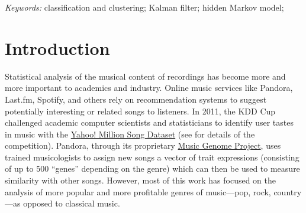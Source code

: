 \documentclass[12pt]{article}
\def\spacingset#1{\renewcommand{\baselinestretch}%
{#1}\small\normalsize} \spacingset{1}
\newcommand{\attn}[1]{\textcolor{red}{Note: #1}}
\begin{document}
\noindent%
{\it Keywords:} classification and clustering; Kalman filter; hidden Markov model; 
\vfill

\newpage

\spacingset{1.45} %











\section{Introduction}
\label{sec:introduction}


Statistical analysis of the musical content of recordings has
become more and more important to academics and industry. Online
music services like Pandora, Last.fm, Spotify, and others rely on
recommendation systems to suggest potentially interesting or related
songs to listeners. In 2011, the KDD Cup challenged academic computer
scientists and statisticians to identify user tastes in music with the
\href{http://labrosa.ee.columbia.edu/millionsong/}{Yahoo! Million
  Song Dataset} (see \citet{DrorKoenigstein2012} for details of the
competition). Pandora, through its proprietary
\href{https://www.pandora.com/about/mgp}{Music Genome Project}, uses
trained musicologists to assign new songs a vector of trait
expressions (consisting of up to 500 ``genes'' depending on the genre)
which can then be used to measure similarity with other
songs. However, most of this work has focused on the analysis of more popular
and more profitable genres of music---pop, rock, country---as opposed
to classical music. 
\end{document}
